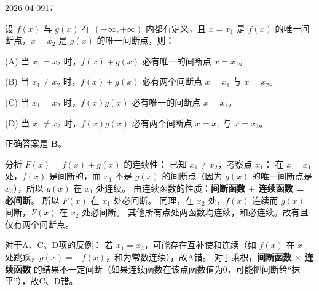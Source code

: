 \begin{mistake}{2026-04-09}{17}

\begin{problemcontent}
设 \( f(x) \) 与 \( g(x) \) 在 \( (-\infty, +\infty) \) 内都有定义，且 \( x=x_1 \) 是 \( f(x) \) 的唯一间断点，\( x=x_2 \) 是 \( g(x) \) 的唯一间断点，则：

(A) 当 \( x_1=x_2 \) 时，\( f(x)+g(x) \) 必有唯一的间断点 \( x=x_1 \)。

(B) 当 \( x_1 \neq x_2 \) 时，\( f(x)+g(x) \) 必有两个间断点 \( x=x_1 \) 与 \( x=x_2 \)。

(C) 当 \( x_1=x_2 \) 时，\( f(x)g(x) \) 必有唯一的间断点 \( x=x_1 \)。

(D) 当 \( x_1 \neq x_2 \) 时，\( f(x)g(x) \) 必有两个间断点 \( x=x_1 \) 与 \( x=x_2 \)。
\end{problemcontent}

\begin{solutioncontent}
正确答案是 \textbf{B}。

分析 \(F(x) = f(x) + g(x)\) 的连续性：
已知 \(x_1 \neq x_2\)，考察点 \(x_1\)：
在 \(x = x_1\) 处，\(f(x)\) 是间断的，而 \(x_1\) 不是 \(g(x)\) 的间断点（因为 \(g(x)\) 的唯一间断点是 \(x_2\)），所以 \(g(x)\) 在 \(x_1\) 处连续。
由连续函数的性质：\textbf{间断函数 \(\pm\) 连续函数 = 必间断}。
所以 \(F(x)\) 在 \(x_1\) 处必间断。
同理，在 \(x_2\) 处，\(f(x)\) 连续而 \(g(x)\) 间断，\(F(x)\) 在 \(x_2\) 处必间断。
其他所有点处两函数均连续，和必连续。故有且仅有两个间断点。

对于A、C、D项的反例：
若 \(x_1 = x_2\)，可能存在互补使和连续（如 \(f(x)\) 在 \(x_1\) 处跳跃，\(g(x)=-f(x)\)，和为常数连续），故A错。
对于乘积，\textbf{间断函数 \(\times\) 连续函数} 的结果不一定间断（如果连续函数在该点函数值为0，可能把间断给“抹平”），故C、D错。
\end{solutioncontent}


\end{mistake}
